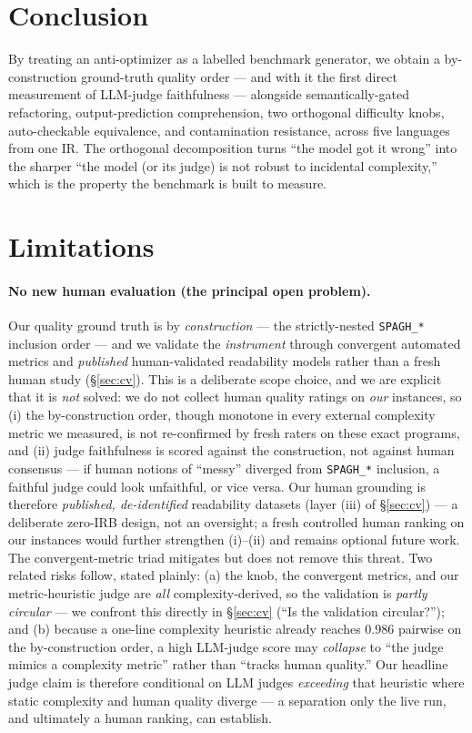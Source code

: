 \documentclass[11pt]{article}
\begin{document}
\section{Conclusion}
By treating an anti-optimizer as a labelled benchmark generator, we obtain a
by-construction ground-truth quality order --- and with it the first direct measurement of
LLM-judge faithfulness --- alongside semantically-gated refactoring, output-prediction
comprehension, two orthogonal difficulty knobs, auto-checkable equivalence, and
contamination resistance, across five languages from one IR. The orthogonal decomposition
turns ``the model got it wrong'' into the sharper ``the model (or its judge) is not robust
to incidental complexity,'' which is the property the benchmark is built to measure.

\section*{Limitations}
\paragraph{No new human evaluation (the principal open problem).} Our quality ground truth
is by \emph{construction} --- the strictly-nested \texttt{SPAGH\_*} inclusion order --- and
we validate the \emph{instrument} through convergent automated metrics and \emph{published}
human-validated readability models rather than a fresh human study (\S\ref{sec:cv}). This
is a deliberate scope choice, and we are explicit that it is \emph{not} solved: we do not
collect human quality ratings on \emph{our} instances, so (i) the by-construction order,
though monotone in every external complexity metric we measured, is not re-confirmed by
fresh raters on these exact programs, and (ii) judge faithfulness is scored against the
construction, not against human consensus --- if human notions of ``messy'' diverged from
\texttt{SPAGH\_*} inclusion, a faithful judge could look unfaithful, or vice versa. Our
human grounding is therefore \emph{published, de-identified} readability datasets (layer
(iii) of \S\ref{sec:cv}) --- a deliberate zero-IRB design, not an oversight; a fresh
controlled human ranking on our instances would further strengthen (i)--(ii) and remains
optional future work. The convergent-metric triad mitigates but does not remove this
threat. Two related risks follow, stated plainly: (a) the knob, the convergent metrics,
and our metric-heuristic judge are \emph{all} complexity-derived, so the validation is
\emph{partly circular} --- we confront this directly in \S\ref{sec:cv} (``Is the
validation circular?''); and (b) because a one-line complexity heuristic already reaches
$0.986$ pairwise on the by-construction order, a high LLM-judge score may \emph{collapse}
to ``the judge mimics a complexity metric'' rather than ``tracks human quality.'' Our
headline judge claim is therefore conditional on LLM judges \emph{exceeding} that heuristic
where static complexity and human quality diverge --- a separation only the live run, and
ultimately a human ranking, can establish.
\end{document}
